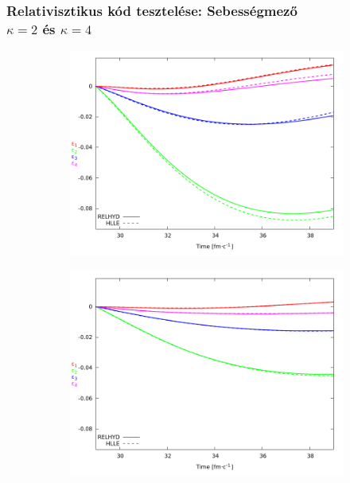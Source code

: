\documentclass{beamer}
\begin{document}
\begin{frame}[noframenumbering]
\frametitle{Relativisztikus kód tesztelése: Sebességmező \\ $\kappa=2$ és $\kappa=4$}
\begin{center}
\begin{figure}[H]
	\centering
    \begin{subfigure}[b]{0.49\textwidth}
    		\includegraphics[width=\textwidth]{pic/res/hr_v_kappa=2}
	\end{subfigure}
	\begin{subfigure}[b]{0.49\textwidth}
        	\includegraphics[width=\textwidth]{pic/res/hr_v_kappa=4}
	\end{subfigure}
\end{figure}
\end{center}
\end{frame}
\end{document}
